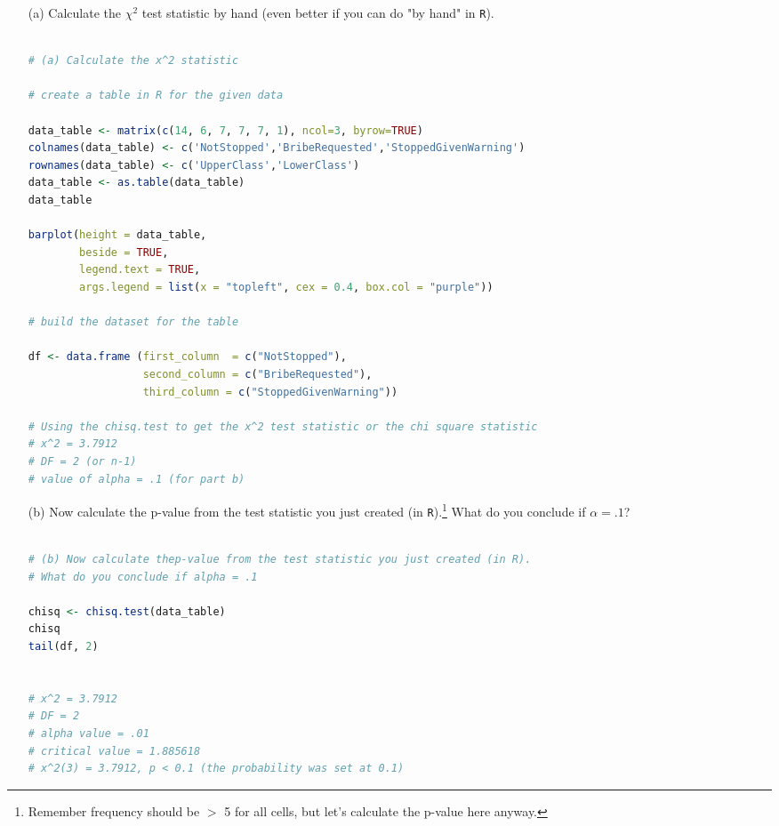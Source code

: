 \documentclass[12pt,letterpaper]{article}
\begin{document}
\begin{enumerate}
	
	\item [(a)]
	Calculate the $\chi^2$ test statistic by hand (even better if you can do "by hand" in \texttt{R}).\\
	\vspace{1cm}
	
	\begin{lstlisting}[language=R]

# (a) Calculate the x^2 statistic

# create a table in R for the given data

data_table <- matrix(c(14, 6, 7, 7, 7, 1), ncol=3, byrow=TRUE)
colnames(data_table) <- c('NotStopped','BribeRequested','StoppedGivenWarning')
rownames(data_table) <- c('UpperClass','LowerClass')
data_table <- as.table(data_table)
data_table

barplot(height = data_table, 
        beside = TRUE, 
        legend.text = TRUE,
        args.legend = list(x = "topleft", cex = 0.4, box.col = "purple"))

# build the dataset for the table

df <- data.frame (first_column  = c("NotStopped"),
                  second_column = c("BribeRequested"),
                  third_column = c("StoppedGivenWarning"))

# Using the chisq.test to get the x^2 test statistic or the chi square statistic
# x^2 = 3.7912
# DF = 2 (or n-1)
# value of alpha = .1 (for part b)

\end{lstlisting}
	
	\newpage
	\item [(b)]
	Now calculate the p-value from the test statistic you just created (in \texttt{R}).\footnote{Remember frequency should be $>$ 5 for all cells, but let's calculate the p-value here anyway.}  What do you conclude if $\alpha = .1$?\\
	
		\begin{lstlisting}[language=R]

# (b) Now calculate thep-value from the test statistic you just created (in R).
# What do you conclude if alpha = .1

chisq <- chisq.test(data_table)
chisq
tail(df, 2)


# x^2 = 3.7912
# DF = 2
# alpha value = .01
# critical value = 1.885618
# x^2(3) = 3.7912, p < 0.1 (the probability was set at 0.1)


\end{lstlisting}
\end{enumerate}
\end{document}
